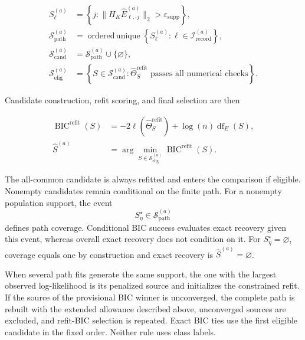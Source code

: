 \documentclass[preprint,12pt,authoryear]{elsarticle}
\begin{document}
\begin{equation}
\label{eq:path-support-candidates}
\begin{aligned}
S_\ell^{(a)}
&=\left\{
j:\lVert H_K\widehat E_{\ell,\cdot j}^{(a)}\rVert_2
>\varepsilon_{\mathrm{supp}}
\right\},\\
\mathcal S_{\mathrm{path}}^{(a)}
&=\operatorname{ordered\,unique}
\left\{S_\ell^{(a)}:
\ell\in\mathcal I_{\mathrm{record}}^{(a)}\right\},\\
\mathcal S_{\mathrm{cand}}^{(a)}
&=\mathcal S_{\mathrm{path}}^{(a)}\cup\{\varnothing\},\\
\mathcal S_{\mathrm{elig}}^{(a)}
&=\left\{S\in\mathcal S_{\mathrm{cand}}^{(a)}:
\widehat\Theta_S^{\mathrm{refit}}
\text{ passes all numerical checks}\right\}.
\end{aligned}
\end{equation}

Candidate construction, refit scoring, and final selection are then

\begin{equation}
\label{eq:refit-bic}
\begin{aligned}
\operatorname{BIC}^{\mathrm{refit}}(S)
&=-2\ell(\widehat\Theta_S^{\mathrm{refit}})
+\log(n)\operatorname{df}_{E}(S),\\
\widehat S^{(a)}
&=\arg\min_{S\in\mathcal S_{\mathrm{elig}}^{(a)}}
\operatorname{BIC}^{\mathrm{refit}}(S).
\end{aligned}
\end{equation}

The all-common candidate is always refitted and enters the comparison if
eligible. Nonempty candidates remain conditional on the finite path. For a
nonempty population support, the event
\[
S_\eta^\star\in\mathcal S_{\mathrm{path}}^{(a)}
\]
defines path coverage. Conditional BIC success evaluates exact recovery given
this event, whereas overall exact recovery does not condition on it. For
$S_\eta^\star=\varnothing$, coverage equals one by construction and exact
recovery is $\widehat S^{(a)}=\varnothing$.

When several path fits generate the same support, the one with the largest
observed log-likelihood is its penalized source and initializes the constrained
refit. If the source of the provisional BIC winner is unconverged, the complete
path is rebuilt with the extended allowance described above, unconverged
sources are excluded, and refit-BIC selection is repeated. Exact BIC ties use
the first eligible candidate in the fixed order. Neither rule uses class
labels.
\end{document}
